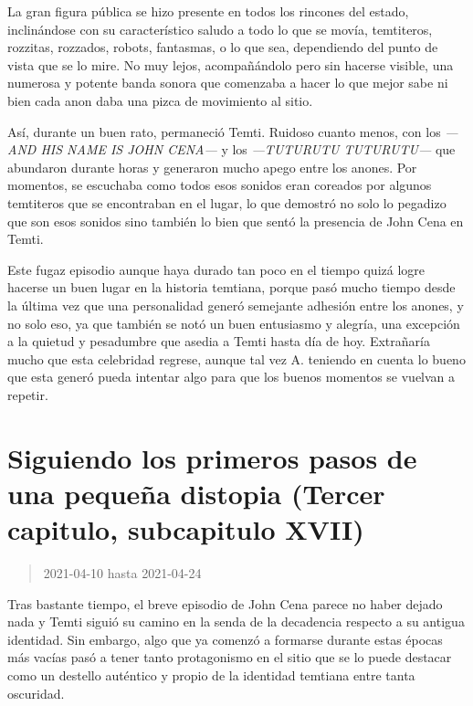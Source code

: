 \documentclass[
  spanish,
]{book}
\begin{document}
La gran figura pública se hizo presente en todos los rincones del estado, inclinándose con su característico saludo a todo lo que se movía, temtiteros, rozzitas, rozzados, robots, fantasmas, o lo que sea, dependiendo del punto de vista que se lo mire. No muy lejos, acompañándolo pero sin hacerse visible, una numerosa y potente banda sonora que comenzaba a hacer lo que mejor sabe ni bien cada anon daba una pizca de movimiento al sitio.

Así, durante un buen rato, permaneció Temti. Ruidoso cuanto menos, con los \emph{---AND HIS NAME IS JOHN CENA---} y los \emph{---TUTURUTU TUTURUTU---} que abundaron durante horas y generaron mucho apego entre los anones. Por momentos, se escuchaba como todos esos sonidos eran coreados por algunos temtiteros que se encontraban en el lugar, lo que demostró no solo lo pegadizo que son esos sonidos sino también lo bien que sentó la presencia de John Cena en Temti.

Este fugaz episodio aunque haya durado tan poco en el tiempo quizá logre hacerse un buen lugar en la historia temtiana, porque pasó mucho tiempo desde la última vez que una personalidad generó semejante adhesión entre los anones, y no solo eso, ya que también se notó un buen entusiasmo y alegría, una excepción a la quietud y pesadumbre que asedia a Temti hasta día de hoy. Extrañaría mucho que esta celebridad regrese, aunque tal vez A. teniendo en cuenta lo bueno que esta generó pueda intentar algo para que los buenos momentos se vuelvan a repetir.

\hypertarget{siguiendo-los-primeros-pasos-de-una-pequeuxf1a-distopia-tercer-capitulo-subcapitulo-xvii}{%
\section{Siguiendo los primeros pasos de una pequeña distopia (Tercer capitulo, subcapitulo XVII)}\label{siguiendo-los-primeros-pasos-de-una-pequeuxf1a-distopia-tercer-capitulo-subcapitulo-xvii}}

\begin{quote}
2021-04-10 hasta 2021-04-24
\end{quote}

Tras bastante tiempo, el breve episodio de John Cena parece no haber dejado nada y Temti siguió su camino en la senda de la decadencia respecto a su antigua identidad. Sin embargo, algo que ya comenzó a formarse durante estas épocas más vacías pasó a tener tanto protagonismo en el sitio que se lo puede destacar como un destello auténtico y propio de la identidad temtiana entre tanta oscuridad.
\end{document}
